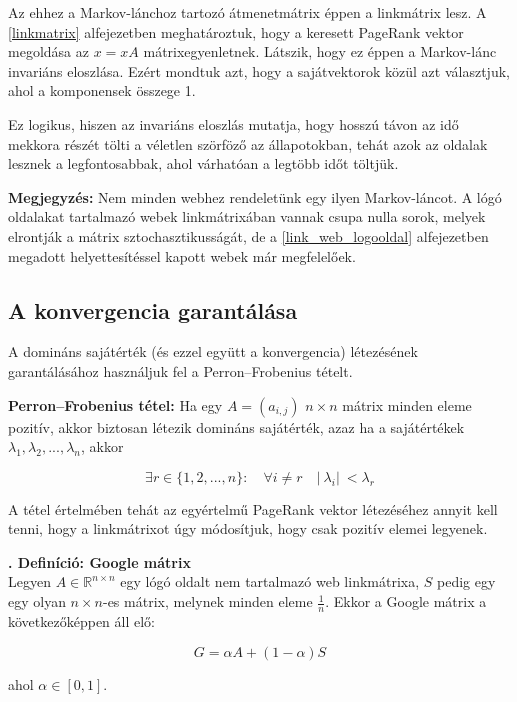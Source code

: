 \documentclass[12pt,a4paper]{article}
\newcounter{definicioszam}
\newenvironment{definicio}[1]
{{\medskip}\noindent \stepcounter{definicioszam}
{\bfseries{\thedefinicioszam. Definíció: #1\\[1ex]}}}{\bigskip }
\begin{document}
Az ehhez a Markov-lánchoz tartozó átmenetmátrix éppen a linkmátrix lesz. A \ref{linkmatrix} alfejezetben meghatároztuk, hogy a keresett PageRank vektor megoldása az $x = xA$ mátrixegyenletnek. Látszik, hogy ez éppen a Markov-lánc invariáns eloszlása. Ezért mondtuk azt, hogy a sajátvektorok közül azt választjuk, ahol a komponensek összege 1.

Ez logikus, hiszen az invariáns eloszlás mutatja, hogy hosszú távon az idő mekkora részét tölti a véletlen szörföző az állapotokban, tehát azok az oldalak lesznek a legfontosabbak, ahol várhatóan a legtöbb időt töltjük.

\vspace{0.1cm}
\textbf{Megjegyzés:} Nem minden webhez rendeletünk egy ilyen Markov-láncot. A lógó oldalakat tartalmazó webek linkmátrixában vannak csupa nulla sorok, melyek elrontják a mátrix sztochasztikusságát, de a \ref{link_web_logooldal} alfejezetben megadott helyettesítéssel kapott webek már megfelelőek. 

\subsection{A konvergencia garantálása}\label{konvergencia_garantalas}

A domináns sajátérték (és ezzel együtt a konvergencia) létezésének garantálásához használjuk fel a Perron–Frobenius tételt.

\vspace{0.1cm}
\textbf{Perron–Frobenius tétel:} Ha egy $A = (a_{i,j})$ $n \times n$ mátrix minden eleme pozitív, akkor biztosan létezik domináns sajátérték, azaz ha a sajátértékek $\lambda_1 , \lambda_2 , ... , \lambda_n$, akkor

\[ \exists r \in \{1,2,...,n\}: \quad \forall i \neq r \quad |\ \lambda_i |\ < \lambda_r  \]

A tétel értelmében tehát az egyértelmű PageRank vektor létezéséhez annyit kell tenni, hogy a linkmátrixot úgy módosítjuk, hogy csak pozitív elemei legyenek.

\begin{definicio}{Google mátrix}
	Legyen $A \in \mathbb{R}^{n \times n}$ egy lógó oldalt nem tartalmazó web linkmátrixa, $S$ pedig egy egy olyan $n \times n$-es mátrix, melynek minden eleme $\frac{1}{n}$. Ekkor a Google mátrix a következőképpen áll elő:
	
	\[ G = \alpha A + (1-\alpha) S \]
	
	ahol $\alpha \in [0,1]$.
\end{definicio}
\end{document}
